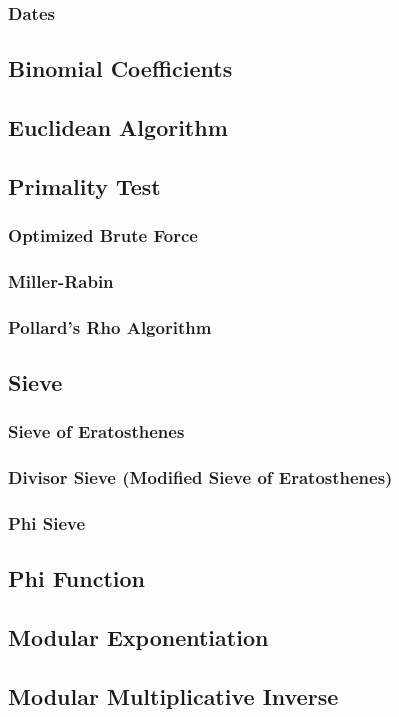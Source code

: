 \documentclass[8pt,a4paper,landscape,oneside]{amsart}
\begin{document}
\begin{multicols*}{3}
		\subsubsection{Dates}
	\subsection{Binomial Coefficients}
	\subsection{Euclidean Algorithm}
	\subsection{Primality Test}
		\subsubsection{Optimized Brute Force}
		\subsubsection{Miller-Rabin}
		\subsubsection{Pollard's Rho Algorithm}
	\subsection{Sieve}
		\subsubsection{Sieve of Eratosthenes}
		\subsubsection{Divisor Sieve (Modified Sieve of Eratosthenes)}
		\subsubsection{Phi Sieve}
	\subsection{Phi Function}
	\subsection{Modular Exponentiation}
	\subsection{Modular Multiplicative Inverse}

\end{multicols*}
\end{document}
